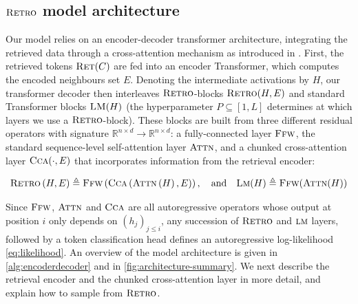 \subsection{$\textsc{Retro}$ model architecture}
\label{subsec-model}
Our model relies on an encoder-decoder transformer architecture, integrating the retrieved data through a cross-attention mechanism as introduced in \citet{vaswani2017attention}.
First, the retrieved tokens $\textsc{Ret}(C)$ are fed into an encoder Transformer, which computes the encoded neighbours set $E$. Denoting the intermediate activations by $H$, our transformer decoder then interleaves $\textsc{Retro}$-blocks $\textsc{Retro} (H, E)$ and standard Transformer blocks $\textsc{LM}(H)$ (the hyperparameter $P \subseteq [1, L]$ determines at which layers we use a $\textsc{Retro}$-block).
These blocks are built from three different residual operators with signature $\mathbb{R}^{n \times d} \to \mathbb{R}^{n \times d}$: a fully-connected layer $\textsc{Ffw}$, the standard sequence-level self-attention layer $\textsc{Attn}$, and a chunked cross-attention layer $\textsc{Cca}( \cdot, E)$ that incorporates information from the retrieval encoder:

\begin{equation}
   \textsc{Retro} \left(H, E\right) \triangleq \textsc{Ffw} \left( \textsc{Cca}\left( \textsc{Attn}\left(H\right) , E\right) \right),\quad\text{and}\quad
    \textsc{Lm}(H) \triangleq \textsc{Ffw}(\textsc{Attn}(H))
\end{equation}

Since $\textsc{Ffw}$, $\textsc{Attn}$ and $\textsc{Cca}$ are all autoregressive operators whose output at position $i$ only depends on $(h_{j})_{j \leqslant i}$, any succession of $\textsc{Retro}$ and $\textsc{lm}$ layers, followed by a token classification head defines an autoregressive log-likelihood \eqref{eq:likelihood}. 
An overview of the model architecture is given in \autoref{alg:encoderdecoder} and in \autoref{fig:architecture-summary}.
We next describe the retrieval encoder and the chunked cross-attention layer in more detail, and explain how to sample from $\textsc{Retro}$.

